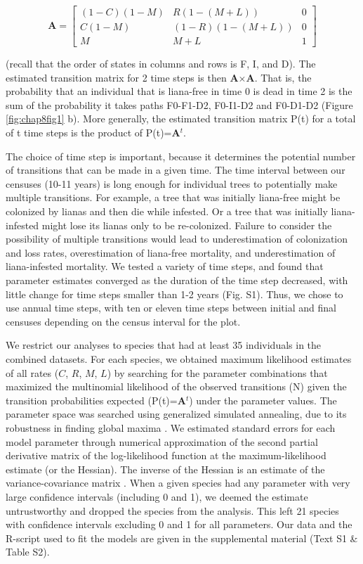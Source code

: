\documentclass[b5paper,justified]{tufte-book} %
\begin{document}
\begin{fullwidth}
\begin{equation}
\textbf{A}=
  \begin{bmatrix}
 (1-C)(1-M)& R(1-(M+L)) & 0 \\ 
 C(1-M) & (1-R)(1-(M+L)) & 0\\ 
 M & M + L  & 1			
  \end{bmatrix}
\end{equation}

 (recall that the order of states in columns and rows is F, I, and D).  The estimated transition matrix for 2 time steps is then \textbf{A}$\times$\textbf{A}.  That is, the probability that an individual that is liana-free in time 0 is dead in time 2 is the sum of the probability it takes paths F0-F1-D2, F0-I1-D2 and F0-D1-D2 (Figure \ref{fig:chap8fig1} b).  More generally, the estimated transition matrix P(t) for a total of t time steps is the product of  P(t)=\textbf{A}$^t$. 
  
The choice of time step is important, because it determines the potential number of transitions that can be made in a given time.  The time interval between our censuses (10-11 years) is long enough for individual trees to potentially make multiple transitions. For example, a tree that was initially liana-free might be colonized by lianas and then die while infested. Or a tree that was initially liana-infested might lose its lianas only to be re-colonized. Failure to consider the possibility of multiple transitions would lead to underestimation of colonization and loss rates, overestimation of liana-free mortality, and underestimation of liana-infested mortality. We tested a variety of time steps, and found that parameter estimates converged as the duration of the time step decreased, with little change for time steps smaller than 1-2 years (Fig. S1). Thus, we chose to use annual time steps, with ten or eleven time steps between initial and final censuses depending on the census interval for the plot. 

We restrict our analyses to species that had at least 35 individuals in the combined datasets.  For each species, we obtained maximum likelihood estimates of all rates ($C$, $R$, $M$, $L$) by searching for the parameter combinations that maximized the multinomial likelihood of the observed transitions (N) given the transition probabilities expected (P(t)=\textbf{A}$^t$) under the parameter values. The parameter space was searched using generalized simulated annealing, due to its robustness in finding global maxima \citep{Xiang2013}. We estimated standard errors for each model parameter through numerical approximation of the second partial derivative matrix of the log-likelihood function at the maximum-likelihood estimate (or the Hessian). The inverse of the Hessian is an estimate of the variance-covariance matrix \citep[e.g.][]{Bolker2008}. When a given species had any parameter with very large confidence intervals (including 0 and 1), we deemed the estimate untrustworthy and dropped the species from the analysis. This left 21 species with confidence intervals excluding 0 and 1 for all parameters. Our data and the R-script used to fit the models are given in the supplemental material (Text S1 \& Table S2). 


\end{fullwidth}
\end{document}
